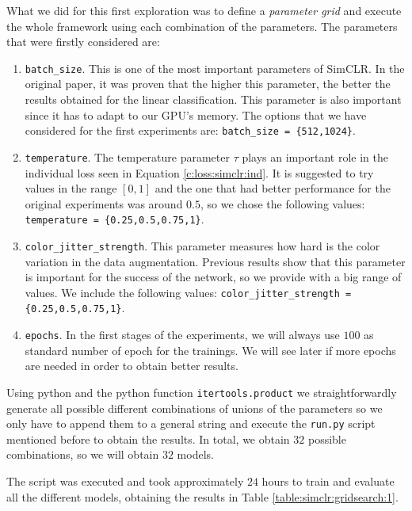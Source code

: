 What we did for this first exploration was to define a \emph{parameter grid} and execute the whole framework using each combination of the parameters. The parameters that were firstly considered are:
\begin{enumerate}
\item \lstinline{batch_size}. This is one of the most important parameters of SimCLR. In the original paper, it was proven that the higher this parameter, the better the results obtained for the linear classification. This parameter is also important since it has to adapt to our GPU's memory. The options that we have considered for the first experiments are: \lstinline|batch_size = {512,1024}|.

\item \lstinline{temperature}. The temperature parameter $\tau$ plays an important role in the individual loss seen in Equation \eqref{c:loss:simclr:ind}. It is suggested to try values in the range $[0,1]$ and the one that had better performance for the original experiments was around $0.5$, so we chose the following values: \lstinline|temperature = {0.25,0.5,0.75,1}|.

\item \lstinline{color_jitter_strength}. This parameter measures how hard is the color variation in the data augmentation. Previous results show that this parameter is important for the success of the network, so we provide with a big range of values. We include the following values: \lstinline|color_jitter_strength = {0.25,0.5,0.75,1}|.

\item \lstinline{epochs}. In the first stages of the experiments, we will always use $100$ as standard number of epoch for the trainings. We will see later if more epochs are needed in order to obtain better results.
\end{enumerate}

Using python and the python function \lstinline{itertools.product} we straightforwardly generate all possible different combinations of unions of the parameters so we only have to append them to a general string and execute the \lstinline{run.py} script mentioned before to obtain the results. In total, we obtain $32$ possible combinations, so we will obtain $32$ models. 

The script was executed and took approximately $24$ hours to train and evaluate all the different models, obtaining the results in Table \ref{table:simclr:gridsearch:1}.

